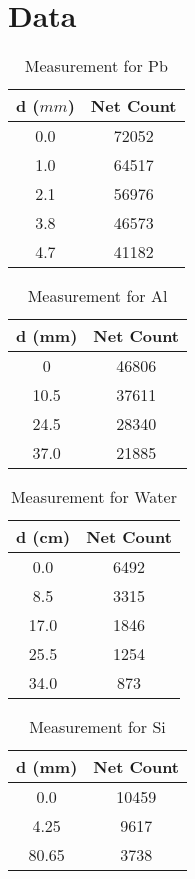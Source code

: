 \documentclass[letterpaper,12pt]{article}
\begin{document}
\section{Data}
\begin{table}[H]
  \centering
  \begin{tabular}{cc}
    \hline
    d ($\si{mm}$) & Net Count\\
    \hline
    0.0 & 72052\\
    1.0 & 64517\\
    2.1 & 56976\\
    3.8 & 46573\\
    4.7 & 41182\\
    \hline
  \end{tabular}
  \caption{Measurement for Pb}
  \label{tab:pb}
\end{table}
\begin{table}[H]
  \centering
  \begin{tabular}{cc}
    \hline
    d (mm) & Net Count\\
    \hline
    0 & 46806\\
    10.5 & 37611\\
    24.5 & 28340\\
    37.0 & 21885\\
    \hline
  \end{tabular}
  \caption{Measurement for Al}
  \label{tab:al}
\end{table}

\begin{table}[H]
  \centering
  \begin{tabular}{cc}
    \hline
    d (cm) & Net Count \\ \hline
    0.0    & 6492      \\
    8.5    & 3315      \\
    17.0   & 1846      \\
    25.5   & 1254      \\
    34.0   & 873       \\
    \hline
  \end{tabular}
  \caption{Measurement for Water}
  \label{tab:h2o}
\end{table}
\begin{table}[H]
  \centering
  \begin{tabular}{cc}
    \hline
    d (mm) & Net Count \\ \hline
    0.0    & 10459     \\
    4.25   & 9617      \\
    80.65  & 3738      \\
    \hline
  \end{tabular}
  \caption{Measurement for Si}
  \label{tab:si}
\end{table}\newpage
\end{document}
